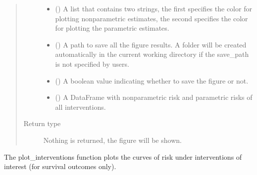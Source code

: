 \documentclass[letterpaper,10pt,english]{sphinxmanual}
\begin{document}
\begin{fulllineitems}
\begin{quote}
\begin{description}
\begin{itemize}
\item {} 
\sphinxAtStartPar
{} () \textendash{} A list that contains two strings, the first specifies the color for plotting nonparametric estimates, the second
specifies the color for plotting the parametric estimates.

\item {} 
\sphinxAtStartPar
{} () \textendash{} A path to save all the figure results. A folder will be created automatically in the current working directory
if the save\_path is not specified by users.

\item {} 
\sphinxAtStartPar
{} () \textendash{} A boolean value indicating whether to save the figure or not.

\item {} 
\sphinxAtStartPar
{} () \textendash{} A DataFrame with nonparametric risk and parametric risks of all interventions.

\end{itemize}

\item[{Return type}] \leavevmode
\sphinxAtStartPar
Nothing is returned, the figure will be shown.

\end{description}\end{quote}

\end{fulllineitems}


\sphinxAtStartPar
The plot\_interventions function plots the curves of risk under interventions of interest (for survival outcomes only).
\end{document}

